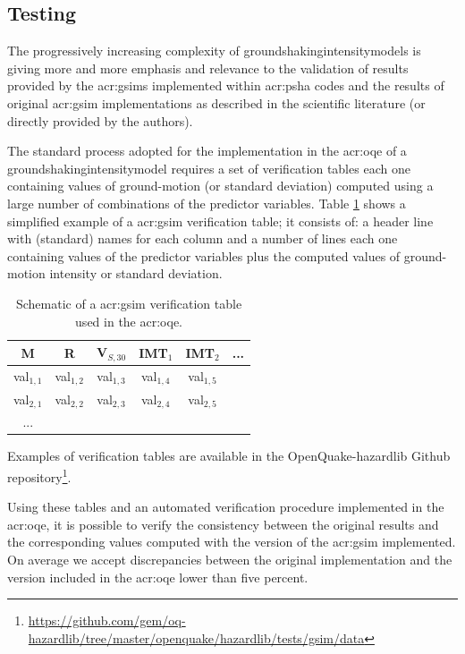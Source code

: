 \subsection{Testing}
%
The progressively increasing complexity of 
\glspl{groundshakingintensitymodel}
is giving more and more emphasis and relevance to the validation 
of results provided by the \glspl{acr:gsim} implemented within 
\gls{acr:psha} codes and the results of original \gls{acr:gsim} 
implementations as described in the scientific literature 
(or directly provided by the authors).

The standard process adopted for the implementation in the 
\gls{acr:oqe} of a \gls{groundshakingintensitymodel} requires a 
set of verification tables each one containing values of 
ground-motion (or standard deviation) computed using a large 
number of combinations of the predictor variables. 
%
Table \ref{tab:verification} shows a simplified example of a 
\gls{acr:gsim} verification table; it consists of: a header 
line with (standard) names for each column and a number
of lines each one containing values of the predictor variables
plus the computed values of ground-motion intensity or standard
deviation.
\begin{table}[!ht]
\centering
\caption{Schematic of a \gls{acr:gsim} verification table used in the 
\gls{acr:oqe}.}
\begin{tabular}{|cccccc|}
\hline
\rowcolor{anti-flashwhite}
M & R & V$_{S,30}$ & IMT$_1$ & IMT$_2$ & ... \\
\hline 
val$_{1,1}$ & val$_{1,2}$ & val$_{1,3}$ & val$_{1,4}$ & val$_{1,5}$ & \\
val$_{2,1}$ & val$_{2,2}$ & val$_{2,3}$ & val$_{2,4}$ & val$_{2,5}$ & \\
... & & & & & \\
\hline
\end{tabular}
\label{tab:verification}
\end{table}
Examples of verification tables are available in the OpenQuake-hazardlib Github
repository\footnote{
\href{https://github.com/gem/oq-hazardlib/tree/master/openquake/hazardlib/tests/gsim/data}{
https://github.com/gem/oq-hazardlib/tree/master/openquake/hazardlib/tests/gsim/data}
}.

Using these tables and an automated verification procedure implemented
in the \gls{acr:oqe}, it is possible to verify the consistency between 
the original results and the corresponding values computed with the 
version of the \gls{acr:gsim} implemented. 
%
On average we accept discrepancies between the original implementation and the
version included in the \gls{acr:oqe} lower than five percent.

